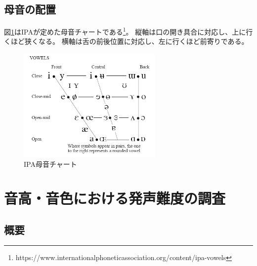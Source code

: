 \documentclass[10.5ptj,a4j,dvipdfmx,uplatex, oneside, openany, report, draft]{jsbook}%
\begin{document}
\section{母音の配置}
図\ref{vowels}はIPAが定めた母音チャートである\footnote{https://www.internationalphoneticassociation.org/content/ipa-vowels}。
縦軸は口の開き具合に対応し、上に行くほど狭くなる。
横軸は舌の前後位置に対応し、左に行くほど前寄りである。

\begin{figure}[htbp]
    \begin{center}
      \includegraphics[clip,width=7.0cm]{vowels.png}
      \caption{IPA母音チャート}
      \label{vowels}
    \end{center}
\end{figure}








\chapter{音高・音色における発声難度の調査}
\section{概要}
\end{document}
